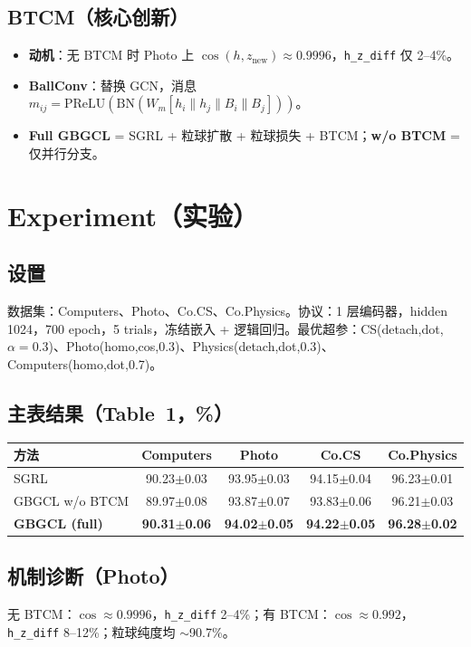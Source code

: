 \documentclass[11pt,a4paper]{article}
\begin{document}
\subsection{BTCM（核心创新）}
\begin{itemize}
  \item \textbf{动机}：无 BTCM 时 Photo 上 $\cos(h, z_{\mathrm{new}})\approx 0.9996$，\texttt{h\_z\_diff} 仅 2--4\%。
  \item \textbf{BallConv}：替换 GCN，消息 $m_{ij}=\mathrm{PReLU}(\mathrm{BN}(W_m[h_i\|h_j\|B_i\|B_j]))$。
  \item \textbf{Full GBGCL} = SGRL + 粒球扩散 + 粒球损失 + BTCM；\textbf{w/o BTCM} = 仅并行分支。
\end{itemize}

\section{Experiment（实验）}

\subsection{设置}
数据集：Computers、Photo、Co.CS、Co.Physics。协议：1 层编码器，hidden 1024，700 epoch，5 trials，冻结嵌入 + 逻辑回归。最优超参：CS(detach,dot,$\alpha{=}0.3$)、Photo(homo,cos,0.3)、Physics(detach,dot,0.3)、Computers(homo,dot,0.7)。

\subsection{主表结果（Table~1，\%）}

\begin{center}
\small
\begin{tabular}{lcccc}
\toprule
\textbf{方法} & \textbf{Computers} & \textbf{Photo} & \textbf{Co.CS} & \textbf{Co.Physics} \\
\midrule
SGRL & 90.23$\pm$0.03 & 93.95$\pm$0.03 & 94.15$\pm$0.04 & 96.23$\pm$0.01 \\
GBGCL w/o BTCM & 89.97$\pm$0.08 & 93.87$\pm$0.07 & 93.83$\pm$0.06 & 96.21$\pm$0.03 \\
\textbf{GBGCL (full)} & \textbf{90.31$\pm$0.06} & \textbf{94.02$\pm$0.05} & \textbf{94.22$\pm$0.05} & \textbf{96.28$\pm$0.02} \\
\bottomrule
\end{tabular}
\end{center}

\subsection{机制诊断（Photo）}
无 BTCM：$\cos\approx 0.9996$，\texttt{h\_z\_diff} 2--4\%；有 BTCM：$\cos\approx 0.992$，\texttt{h\_z\_diff} 8--12\%；粒球纯度均 $\sim$90.7\%。
\end{document}
